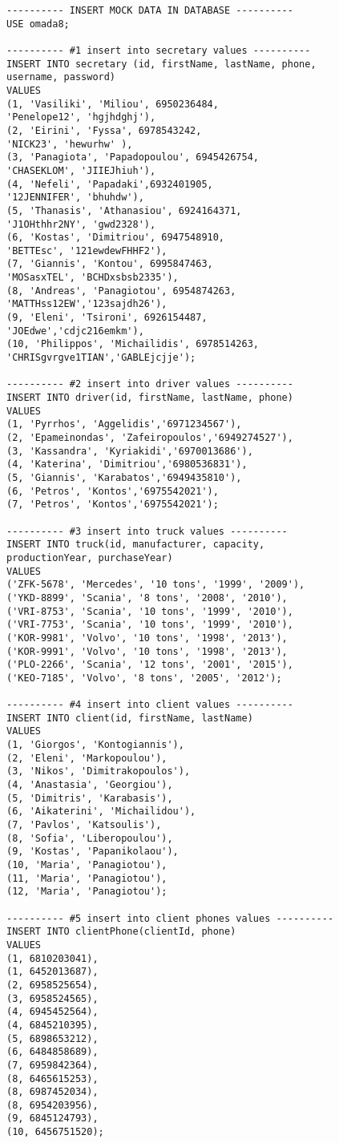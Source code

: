 \begin{lstlisting}
---------- INSERT MOCK DATA IN DATABASE ----------
USE omada8;

---------- #1 insert into secretary values ----------
INSERT INTO secretary (id, firstName, lastName, phone, 
username, password)
VALUES 
(1, 'Vasiliki', 'Miliou', 6950236484, 
'Penelope12', 'hgjhdghj'),
(2, 'Eirini', 'Fyssa', 6978543242, 
'NICK23', 'hewurhw' ),
(3, 'Panagiota', 'Papadopoulou', 6945426754, 
'CHASEKLOM', 'JIIEJhiuh'),
(4, 'Nefeli', 'Papadaki',6932401905, 
'12JENNIFER', 'bhuhdw'),
(5, 'Thanasis', 'Athanasiou', 6924164371, 
'J1OHthhr2NY', 'gwd2328'),
(6, 'Kostas', 'Dimitriou', 6947548910, 
'BETTEsc', '121ewdewFHHF2'),
(7, 'Giannis', 'Kontou', 6995847463, 
'MOSasxTEL', 'BCHDxsbsb2335'),
(8, 'Andreas', 'Panagiotou', 6954874263, 
'MATTHss12EW','123sajdh26'),
(9, 'Eleni', 'Tsironi', 6926154487, 
'JOEdwe','cdjc216emkm'),
(10, 'Philippos', 'Michailidis', 6978514263, 
'CHRISgvrgve1TIAN','GABLEjcjje');

---------- #2 insert into driver values ----------
INSERT INTO driver(id, firstName, lastName, phone)
VALUES
(1, 'Pyrrhos', 'Aggelidis','6971234567'),
(2, 'Epameinondas', 'Zafeiropoulos','6949274527'),
(3, 'Kassandra', 'Kyriakidi','6970013686'),
(4, 'Katerina', 'Dimitriou','6980536831'),
(5, 'Giannis', 'Karabatos','6949435810'),
(6, 'Petros', 'Kontos','6975542021'),
(7, 'Petros', 'Kontos','6975542021');

---------- #3 insert into truck values ----------
INSERT INTO truck(id, manufacturer, capacity, 
productionYear, purchaseYear)
VALUES
('ZFK-5678', 'Mercedes', '10 tons', '1999', '2009'),
('YKD-8899', 'Scania', '8 tons', '2008', '2010'),
('VRI-8753', 'Scania', '10 tons', '1999', '2010'),
('VRI-7753', 'Scania', '10 tons', '1999', '2010'),
('KOR-9981', 'Volvo', '10 tons', '1998', '2013'),
('KOR-9991', 'Volvo', '10 tons', '1998', '2013'),
('PLO-2266', 'Scania', '12 tons', '2001', '2015'),
('KEO-7185', 'Volvo', '8 tons', '2005', '2012');

---------- #4 insert into client values ----------
INSERT INTO client(id, firstName, lastName)
VALUES
(1, 'Giorgos', 'Kontogiannis'),
(2, 'Eleni', 'Markopoulou'),
(3, 'Nikos', 'Dimitrakopoulos'),
(4, 'Anastasia', 'Georgiou'),
(5, 'Dimitris', 'Karabasis'),
(6, 'Aikaterini', 'Michailidou'),
(7, 'Pavlos', 'Katsoulis'),
(8, 'Sofia', 'Liberopoulou'),
(9, 'Kostas', 'Papanikolaou'),
(10, 'Maria', 'Panagiotou'),
(11, 'Maria', 'Panagiotou'),
(12, 'Maria', 'Panagiotou');

---------- #5 insert into client phones values ----------
INSERT INTO clientPhone(clientId, phone)
VALUES
(1, 6810203041),
(1, 6452013687),
(2, 6958525654),
(3, 6958524565),
(4, 6945452564),
(4, 6845210395),
(5, 6898653212),
(6, 6484858689),
(7, 6959842364),
(8, 6465615253),
(8, 6987452034),
(8, 6954203956),
(9, 6845124793),
(10, 6456751520);


\end{lstlisting}
